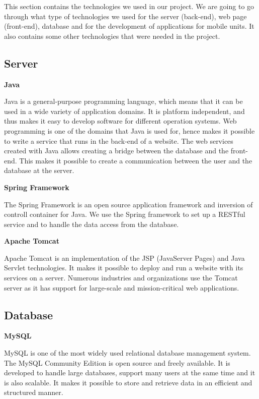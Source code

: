 This section contains the technologies we used in our project.
We are going to go through what type of technologies we used for the server (back-end), web page (front-end), database and for the development of applications for mobile units. 
It also contains some other technologies that were needed in the project.

\subsection{Server}

\textbf{Java} \nocite{Java}

Java is a general-purpose programming language, which means that it can be used in a wide variety of application domains.
It is platform independent, and thus makes it easy to develop software for different operation systems.
Web programming is one of the domains that Java is used for, hence makes it possible to write a service that runs in the back-end of a website.
The web services created with Java allows creating a bridge between the database and the front-end. 
This makes it possible to create a communication between the user and the database at the server.

\textbf{Spring Framework} \nocite{SpringFramework1}\nocite{SpringFramework2}

The Spring Framework is an open source application framework and inversion of controll container for Java. 
We use the Spring framework to set up a RESTful service and to handle the data access from the database. 

\textbf{Apache Tomcat} \nocite{ApacheTomcat}

Apache Tomcat is an implementation of the JSP (JavaServer Pages) and Java Servlet technologies.
It makes it possible to deploy and run a website with its services on a server.
Numerous industries and organizations use the Tomcat server as it has support for large-scale and mission-critical web applications.

\subsection{Database}

\textbf{MySQL} \nocite{MySQL}

MySQL is one of the most widely used relational database management system.
The MySQL Community Edition is open source and freely available.
It is developed to handle large databases, support many users at the same time and it is also scalable.
It makes it possible to store and retrieve data in an efficient and structured manner.

